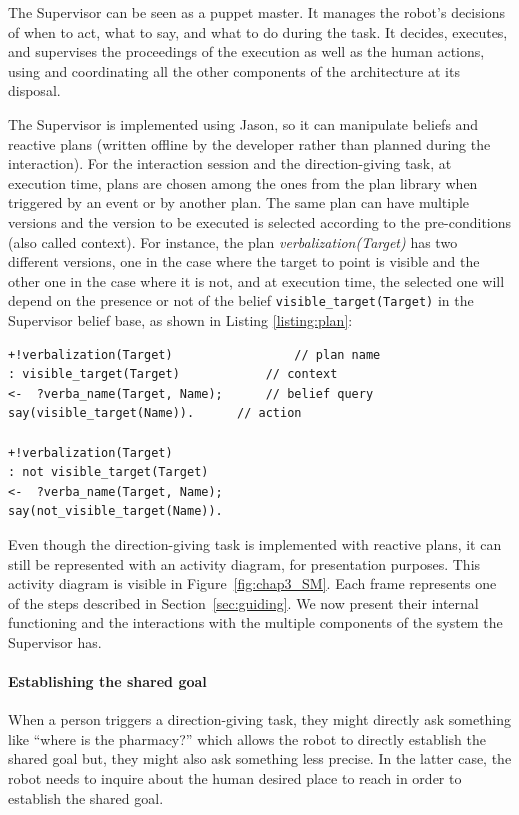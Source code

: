 \documentclass[a4paper,11pt,twoside]{StyleThese}
\begin{document}
The Supervisor can be seen as a puppet master. It manages the robot's decisions of when to act, what to say, and what to do during the task. It decides, executes, and supervises the proceedings of the execution as well as the human actions, using and coordinating all the other components of the architecture at its disposal.

The Supervisor is implemented using Jason, so it can manipulate beliefs and reactive plans (written offline by the developer rather than planned during the interaction). For the interaction session and the direction-giving task, at execution time, plans are chosen among the ones from the plan library when triggered by an event or by another plan. The same plan can have multiple versions and the version to be executed is selected according to the pre-conditions (also called context). For instance, the plan \textit{verbalization(Target)} has two different versions, one in the case where the target to point is visible and the other one in the case where it is not, and at execution time, the selected one will depend on the presence or not of the belief \texttt{visible\_target(Target)} in the Supervisor belief base, as shown in Listing \ref{listing:plan}:

\begin{lstlisting}[caption = Two different plans for \texttt{verbalization(Target)}, label = {listing:plan}]
+!verbalization(Target)                 // plan name
: visible_target(Target)            // context
<-  ?verba_name(Target, Name);      // belief query
say(visible_target(Name)).      // action

+!verbalization(Target) 
: not visible_target(Target)
<-  ?verba_name(Target, Name);
say(not_visible_target(Name)).
\end{lstlisting}

Even though the direction-giving task is implemented with reactive plans, it can still be represented with an activity diagram, for presentation purposes. This activity diagram is visible in Figure~\ref{fig:chap3_SM}. Each frame represents one of the steps described in Section~\ref{sec:guiding}. We now present their internal functioning and the interactions with the multiple components of the system the Supervisor has.

\paragraph{Establishing the shared goal}
When a person triggers a direction-giving task, they might directly ask something like ``where is the pharmacy?'' which allows the robot to directly establish the shared goal but, they might also ask something less precise. In the latter case, the robot needs to inquire about the human desired place to reach in order to establish the shared goal.
\end{document}

